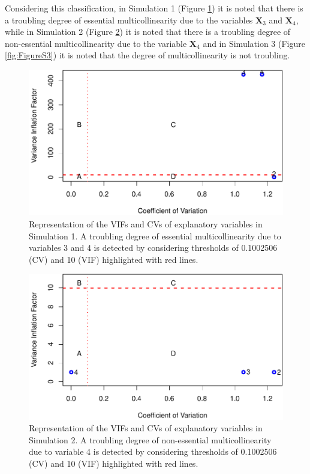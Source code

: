 Considering this classification, in Simulation 1 (Figure \ref{fig:FigureS1}) it is noted that there is a troubling degree of essential multicollinearity due to the variables \(\mathbf{X}_{3}\) and \(\mathbf{X}_{4}\), while in Simulation 2 (Figure \ref{fig:FigureS2}) it is noted that there is a troubling degree of non-essential multicollinearity due to the variable \(\mathbf{X}_{4}\) and in Simulation 3 (Figure \ref{fig:FigureS3}) it is noted that the degree of multicollinearity is not troubling.

\begin{figure}
\centering
\includegraphics{salmeron-etal_files/figure-latex/FigureS1-1.pdf}
\caption{\label{fig:FigureS1}Representation of the VIFs and CVs of explanatory variables in Simulation 1. A troubling degree of essential multicollinearity due to variables 3 and 4 is detected by considering thresholds of 0.1002506 (CV) and 10 (VIF) highlighted with red lines.}
\end{figure}

\begin{figure}
\centering
\includegraphics{salmeron-etal_files/figure-latex/FigureS2-1.pdf}
\caption{\label{fig:FigureS2}Representation of the VIFs and CVs of explanatory variables in Simulation 2. A troubling degree of non-essential multicollinearity due to variable 4 is detected by considering thresholds of 0.1002506 (CV) and 10 (VIF) highlighted with red lines.}
\end{figure}

